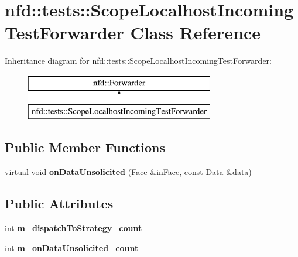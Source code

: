 \hypertarget{classnfd_1_1tests_1_1ScopeLocalhostIncomingTestForwarder}{}\section{nfd\+:\+:tests\+:\+:Scope\+Localhost\+Incoming\+Test\+Forwarder Class Reference}
\label{classnfd_1_1tests_1_1ScopeLocalhostIncomingTestForwarder}
Inheritance diagram for nfd\+:\+:tests\+:\+:Scope\+Localhost\+Incoming\+Test\+Forwarder\+:\begin{figure}[H]
\begin{center}
\leavevmode
\includegraphics[height=2.000000cm]{classnfd_1_1tests_1_1ScopeLocalhostIncomingTestForwarder}
\end{center}
\end{figure}
\subsection*{Public Member Functions}
\begin{DoxyCompactItemize}
\item 
virtual void {\bfseries on\+Data\+Unsolicited} (\hyperlink{classnfd_1_1Face}{Face} \&in\+Face, const \hyperlink{classndn_1_1Data}{Data} \&data)\hypertarget{classnfd_1_1tests_1_1ScopeLocalhostIncomingTestForwarder_a2b353bfe0410f47050120e510bc7c507}{}\label{classnfd_1_1tests_1_1ScopeLocalhostIncomingTestForwarder_a2b353bfe0410f47050120e510bc7c507}

\end{DoxyCompactItemize}
\subsection*{Public Attributes}
\begin{DoxyCompactItemize}
\item 
int {\bfseries m\+\_\+dispatch\+To\+Strategy\+\_\+count}\hypertarget{classnfd_1_1tests_1_1ScopeLocalhostIncomingTestForwarder_a07ec5582bbff352e7ee630670a27f4c4}{}\label{classnfd_1_1tests_1_1ScopeLocalhostIncomingTestForwarder_a07ec5582bbff352e7ee630670a27f4c4}

\item 
int {\bfseries m\+\_\+on\+Data\+Unsolicited\+\_\+count}\hypertarget{classnfd_1_1tests_1_1ScopeLocalhostIncomingTestForwarder_aaa4e5fe9c107e1aaddbcbd5abd68c280}{}\label{classnfd_1_1tests_1_1ScopeLocalhostIncomingTestForwarder_aaa4e5fe9c107e1aaddbcbd5abd68c280}

\end{DoxyCompactItemize}
